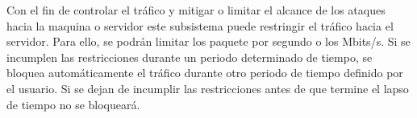 Con el fin de controlar el tráfico y mitigar o limitar el alcance de los ataques hacia la maquina o servidor este subsistema puede restringir el tráfico hacia el servidor. Para ello, se podrán limitar los paquete por segundo o los Mbits/s. Si se incumplen las restricciones durante un periodo determinado de tiempo, se bloquea automáticamente el tráfico durante otro periodo de tiempo definido por el usuario. Si se dejan de incumplir las restricciones antes de que termine el lapso de tiempo no se bloqueará.

